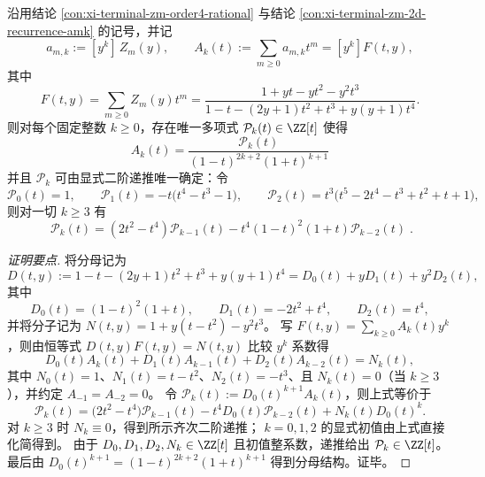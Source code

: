 
\begin{conclusion}\label{con:xi-terminal-zm-fixed-weight-generating-function-rigidity}
沿用结论 \ref{con:xi-terminal-zm-order4-rational} 与结论 \ref{con:xi-terminal-zm-2d-recurrence-amk} 的记号，并记
\[
a_{m,k}:=[y^k]\,Z_m(y),\qquad
A_k(t):=\sum_{m\ge 0}a_{m,k}t^m=[y^k]F(t,y),
\]
其中
\[
F(t,y)=\sum_{m\ge 0}Z_m(y)t^m
=\frac{1+yt-yt^2-y^2t^3}{1-t-(2y+1)t^2+t^3+y(y+1)t^4}.
\]
则对每个固定整数 \(k\ge 0\)，存在唯一多项式 \(\mathcal{P}_k(t)\in\ZZ[t]\) 使得
\[
\boxed{\;
A_k(t)=\frac{\mathcal{P}_k(t)}{(1-t)^{2k+2}(1+t)^{k+1}}\;}
\]
并且 \(\mathcal{P}_k\) 可由显式二阶递推唯一确定：令
\[
\mathcal{P}_0(t)=1,\qquad
\mathcal{P}_1(t)=-t\bigl(t^4-t^3-1\bigr),\qquad
\mathcal{P}_2(t)=t^3\bigl(t^5-2t^4-t^3+t^2+t+1\bigr),
\]
则对一切 \(k\ge 3\) 有
\[
\boxed{\;
\mathcal{P}_k(t)=(2t^2-t^4)\mathcal{P}_{k-1}(t)-t^4(1-t)^2(1+t)\mathcal{P}_{k-2}(t)\; }.
\]
\end{conclusion}
\begin{proof}[证明要点]
将分母记为
\[
D(t,y):=1-t-(2y+1)t^2+t^3+y(y+1)t^4=D_0(t)+yD_1(t)+y^2D_2(t),
\]
其中
\[
D_0(t)=(1-t)^2(1+t),\qquad D_1(t)=-2t^2+t^4,\qquad D_2(t)=t^4,
\]
并将分子记为
\(
N(t,y)=1+y(t-t^2)-y^2t^3
\)。
写 \(F(t,y)=\sum_{k\ge 0}A_k(t)y^k\)，则由恒等式 \(D(t,y)F(t,y)=N(t,y)\) 比较 \(y^k\) 系数得
\[
D_0(t)A_k(t)+D_1(t)A_{k-1}(t)+D_2(t)A_{k-2}(t)=N_k(t),
\]
其中 \(N_0(t)=1\)、\(N_1(t)=t-t^2\)、\(N_2(t)=-t^3\)、且 \(N_k(t)=0\)（当 \(k\ge 3\)），并约定 \(A_{-1}=A_{-2}=0\)。
令 \(\mathcal{P}_k(t):=D_0(t)^{k+1}A_k(t)\)，则上式等价于
\[
\mathcal{P}_k(t)=\bigl(2t^2-t^4\bigr)\mathcal{P}_{k-1}(t)-t^4D_0(t)\mathcal{P}_{k-2}(t)+N_k(t)D_0(t)^k.
\]
对 \(k\ge 3\) 时 \(N_k\equiv 0\)，得到所示齐次二阶递推；
\(k=0,1,2\) 的显式初值由上式直接化简得到。
由于 \(D_0,D_1,D_2,N_k\in\ZZ[t]\) 且初值整系数，递推给出 \(\mathcal{P}_k\in\ZZ[t]\)。
最后由 \(D_0(t)^{k+1}=(1-t)^{2k+2}(1+t)^{k+1}\) 得到分母结构。证毕。
\end{proof}

